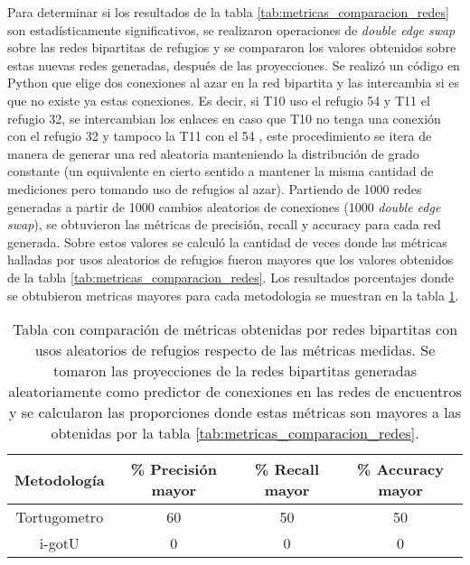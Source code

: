 Para determinar si los resultados de la tabla \ref{tab:metricas_comparacion_redes} son estadísticamente significativos, se realizaron operaciones de \textit{double edge swap} sobre las redes bipartitas de refugios y se compararon los valores obtenidos sobre estas nuevas redes generadas, después de las proyecciones. Se realizó un código en Python que elige dos conexiones al azar en la red bipartita y las intercambia si es que no existe ya estas conexiones. Es decir, si T10 uso el refugio 54 y T11 el refugio 32, se intercambian los enlaces en caso que T10 no tenga una conexión con el refugio 32 y tampoco la T11 con el 54 \cite{github}, este procedimiento se itera de manera de generar una red aleatoria manteniendo la distribución de grado constante (un equivalente en cierto sentido a mantener la misma cantidad de mediciones pero tomando uso de refugios al azar). Partiendo de 1000 redes generadas a partir de 1000 cambios aleatorios de conexiones (1000 \textit{double edge swap}), se obtuvieron las métricas de precisión, recall y accuracy para cada red generada. Sobre estos valores se calculó la cantidad de veces donde las métricas halladas por usos aleatorios de refugios fueron mayores que los valores obtenidos  de la tabla \ref{tab:metricas_comparacion_redes}. Los resultados porcentajes donde se obtubieron metricas mayores para cada metodologia se muestran en la tabla \ref{tab:metricas_comparacion_redes_aleatorias}.
\begin{table}[ht]
    \centering
    \begin{tabular}{|c|c|c|c|}
       
   \hline
    Metodología  & \% Precisión mayor  &  \% Recall mayor & \% Accuracy mayor \\ \hline
    Tortugometro & 60    & 50  & 50    \\ \hline
    i-gotU       & 0        & 0    & 0      \\ \hline
   
    \end{tabular}
    \caption[Tabla con comparación de métricas obtenidas en redes bipartitas con usos aleatorios de refugios respecto a las métricas medidas.]{Tabla con comparación de métricas obtenidas por redes bipartitas con usos aleatorios de refugios respecto de las métricas medidas. Se tomaron las proyecciones de la redes bipartitas generadas aleatoriamente como predictor de conexiones en las redes de encuentros y se calcularon las proporciones donde estas métricas son mayores a las obtenidas por la tabla \ref{tab:metricas_comparacion_redes}.}
    \label{tab:metricas_comparacion_redes_aleatorias}
\end{table}


